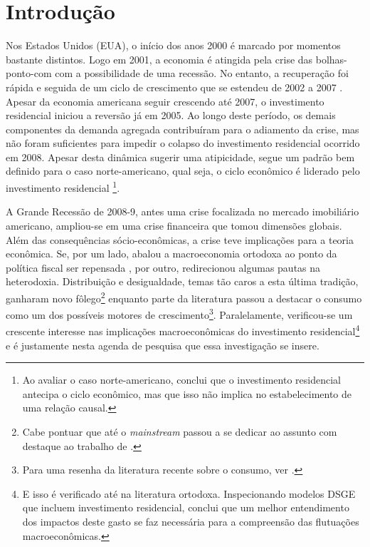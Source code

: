 \chapter{Introdução}

Nos Estados Unidos (EUA), o início dos anos 2000 é marcado por momentos bastante distintos. Logo em 2001, a economia é atingida pela crise das bolhas-ponto-com com a possibilidade de uma recessão. No entanto, a recuperação foi rápida e seguida de um ciclo de crescimento que se estendeu de 2002 a 2007 \cite{cagnin_o_2007}.  Apesar da economia americana seguir crescendo até 2007, o investimento residencial iniciou a reversão já em 2005. Ao longo deste período, os demais componentes da demanda agregada contribuíram para o adiamento da crise, mas não foram suficientes para impedir o colapso do investimento residencial ocorrido em 2008. 
Apesar desta dinâmica sugerir uma atipicidade, segue um padrão bem definido para o caso norte-americano, qual seja, o ciclo econômico é liderado pelo investimento residencial \cites{green_follow_1997}{leamer_housing_2007}{fiebiger_trend_2017}\footnote{
	Ao avaliar o caso norte-americano, \textcite{green_follow_1997} conclui que o investimento residencial antecipa o ciclo econômico, mas que isso não implica no estabelecimento de uma relação causal. 
}.

A Grande Recessão de 2008-9, antes uma crise focalizada no mercado imobiliário americano, ampliou-se em uma crise financeira que tomou dimensões globais. Além das consequências sócio-econômicas, a crise teve implicações para a teoria econômica. Se, por um lado, abalou a macroeconomia ortodoxa ao ponto da política fiscal ser repensada \cite{blanchard_rethinking_2017}, por outro, redirecionou algumas pautas na heterodoxia. Distribuição e desigualdade, temas tão caros a esta última tradição, ganharam novo fôlego\footnote{Cabe pontuar que até o \textit{mainstream} passou a se dedicar ao assunto com destaque ao trabalho de \textcite{piketty_o_2014}.} \cites{carvalho_personal_2016}{ederer_will_2019} enquanto parte da literatura passou a destacar o consumo como um dos possíveis motores de crescimento\footnote{Para uma resenha da literatura recente sobre o consumo, ver \textcite{brochier_macroeconomics_2017}.}. Paralelamente, verificou-se um crescente interesse nas implicações macroeconômicas do investimento residencial\footnote{E isso é verificado até na literatura ortodoxa. Inspecionando modelos DSGE que incluem investimento residencial, \textcite{iacoviello_housing_2010} conclui que um melhor entendimento dos impactos deste gasto se faz necessária para a compreensão das flutuações macroeconômicas.} \cites{teixeira_crescimento_2015}{fiebiger_semi-autonomous_2018} e é justamente nesta agenda de pesquisa que essa investigação se insere. 

